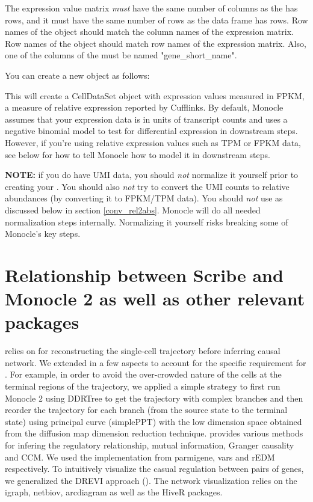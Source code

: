 \documentclass[10pt,oneside]{article}\usepackage[]{graphicx}\usepackage[]{color}
\begin{document}
 The expression value matrix \emph{must} have the same number of columns as the  has rows, and it must have the same number of rows as the  data frame has rows. Row names of the  object should match the column names of the expression matrix. Row names of the  object should match row names of the expression matrix. Also, one of the columns of the
  must be named "gene\_short\_name".

 You can create a new  object as follows:

This will create a CellDataSet object with expression values measured in FPKM, a measure of relative expression reported by Cufflinks. By default, Monocle assumes that your expression data is in units of transcript counts and uses a negative binomial model to test for differential expression in downstream steps. However, if you're using relative expression values such as TPM or FPKM data, see below for how to tell Monocle how to model it in downstream steps.

\textbf{NOTE:} if you do have UMI data, you should \emph{not} normalize it yourself prior to creating your . You should also \emph{not} try to convert the UMI counts to relative abundances (by converting it to FPKM/TPM data). You should \emph{not} use  as discussed below in section \ref{conv_rel2abs}. Monocle will do all needed normalization steps internally. Normalizing it yourself risks breaking some of Monocle's key steps.


\section{Relationship between Scribe and Monocle 2 as well as other relevant packages}
 relies on  for reconstructing the single-cell trajectory before inferring causal network. We extended  in a few aspects to account for the specific requirement for . For example, in order to avoid the over-crowded nature of the cells at the terminal regions of the trajectory, we applied a simple strategy to first run Monocle 2 using DDRTree to get the trajectory with complex branches and then reorder the trajectory for each branch (from the source state to the terminal state) using principal curve (simplePPT) with the low dimension space obtained from the diffusion map dimension reduction technique.  provides various methods for infering the regulatory relationship, mutual information, Granger causality and CCM. We used the implementation from parmigene, vars and rEDM respectively. To intuitively visualize the casual regulation between pairs of genes, we generalized the DREVI approach (\cite{}). The network visualization relies on the igraph, netbiov, arcdiagram as well as the HiveR packages.
\end{document}
